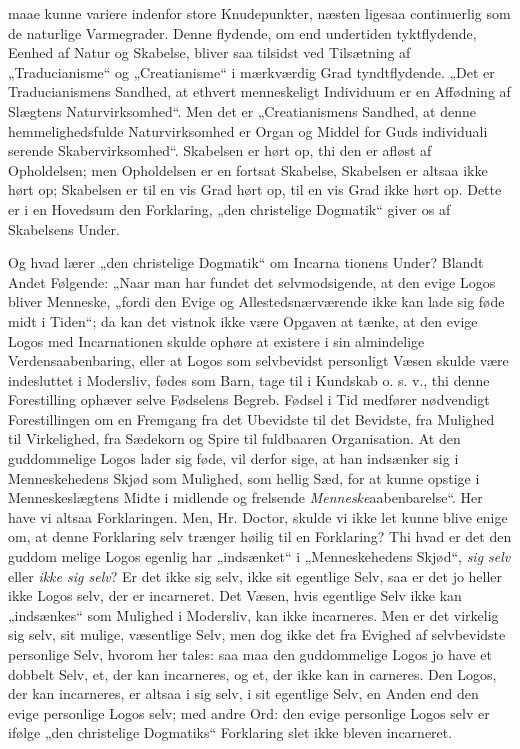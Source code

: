\documentclass[12pt,a4paper]{article}
\newcommand{\opage}[1]{\marginnote{\footnotesize\textit{[#1]}}}
\begin{document}
maae kunne variere indenfor store Knudepunkter, næsten ligesaa
continuerlig som de naturlige Varmegrader. Denne flydende,
om end undertiden tyktflydende, Eenhed af Natur og Skabelse,
bliver saa tilsidst ved Tilsætning af „Traducianisme“ og
„Creatianisme“ i mærkværdig Grad tyndtflydende. „Det er
Traducianismens Sandhed, at ethvert menneskeligt Individuum
er en Affødning af Slægtens Naturvirksomhed“. Men det
er „Creatianismens Sandhed, at denne hemmelighedsfulde
Naturvirksomhed er Organ og Middel for Guds individuali\-%
\opage{8}\setcounter{footnote}{0}%
serende Skabervirksomhed“. Skabelsen er hørt op, thi den er
afløst af Opholdelsen; men Opholdelsen er en fortsat Skabelse,
Skabelsen er altsaa ikke hørt op; Skabelsen er til en vis Grad
hørt op, til en vis Grad ikke hørt op. Dette er i en
Hovedsum den Forklaring, „den christelige Dogmatik“ giver os
af Skabelsens Under.

Og hvad lærer „den christelige Dogmatik“ om Incarna\-%
tionens Under? Blandt Andet Følgende: „Naar man har
fundet det selvmodsigende, at den evige Logos bliver Menneske,
„fordi den Evige og Allestedsnærværende ikke kan lade sig
føde midt i Tiden“; da kan det vistnok ikke være Opgaven at
tænke, at den evige Logos med Incarnationen skulde ophøre
at existere i sin almindelige Verdensaabenbaring, eller at Logos
som selvbevidst personligt Væsen skulde være indesluttet i
Modersliv, fødes som Barn, tage til i Kundskab o. s. v., thi
denne Forestilling ophæver selve Fødselens Begreb. Fødsel
i Tid medfører nødvendigt Forestillingen om en Fremgang
fra det Ubevidste til det Bevidste, fra Mulighed til Virkelighed,
fra Sædekorn og Spire til fuldbaaren Organisation. At den
guddommelige Logos lader sig føde, vil derfor sige, at han
indsænker sig i Menneskehedens Skjød som Mulighed, som
hellig Sæd, for at kunne opstige i Menneskeslægtens Midte i
midlende og frelsende \emph{Menneske}aabenbarelse“. Her have
vi altsaa Forklaringen. Men, Hr. Doctor, skulde vi ikke let
kunne blive enige om, at denne Forklaring selv trænger
høilig til en Forklaring? Thi hvad er det den guddom\-%
melige Logos egenlig har „indsænket“ i „Menneskehedens%
Skjød“, \emph{sig selv} eller \emph{ikke sig selv}? Er det ikke sig selv,
ikke sit egentlige Selv, saa er det jo heller ikke Logos selv,
der er incarneret. Det Væsen, hvis egentlige Selv ikke kan
„indsænkes“ som Mulighed i Modersliv, kan ikke incarneres.
Men er det virkelig sig selv, sit mulige, væsentlige Selv, men
dog ikke det fra Evighed af selvbevidste personlige Selv, hvorom
her tales: saa maa den guddommelige Logos jo have et
dobbelt Selv, et, der kan incarneres, og et, der ikke kan in\-%
carneres. Den Logos, der kan incarneres, er altsaa i sig selv,
i sit egentlige Selv, en Anden end den evige personlige Logos
\opage{9}\setcounter{footnote}{0}%
selv; med andre Ord: den evige personlige Logos selv er
ifølge „den christelige Dogmatiks“ Forklaring slet ikke bleven
incarneret.
\end{document}
